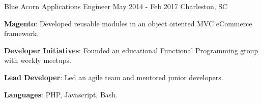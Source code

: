 \begin{cventries}

  \cventry
    {Blue Acorn} %
    {Applications Engineer} %
    {May 2014 - Feb 2017} %
    {Charleston, SC} %
    {
      \begin{cvitems} %
        \item {\color{graytext}\textbf{Magento}}: Developed reusable modules in
          an object oriented MVC eCommerce framework.
        \item {\color{graytext}\textbf{Developer Initiatives}}: Founded an
          educational Functional Programming group with weekly meetups.
        \item {\color{graytext}\textbf{Lead Developer}}: Led an agile team
          and mentored junior developers.
        \item {\color{graytext}\textbf{Languages}}: PHP, Javascript, Bash.
      \end{cvitems}
    }

\end{cventries}
